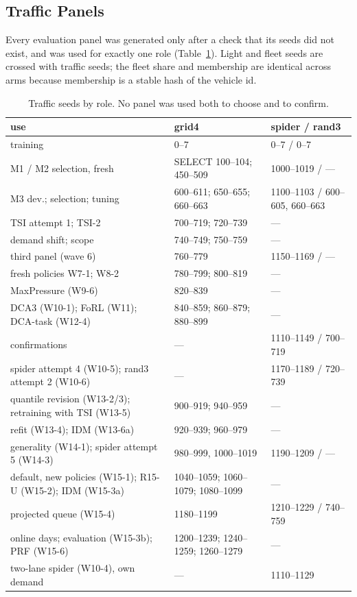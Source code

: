 \subsection{Traffic Panels}
Every evaluation panel was generated only after a check that its seeds did not exist, and was used for exactly one role
(Table~\ref{tab:panels}). Light and fleet seeds are crossed with traffic seeds; the fleet share and membership are identical across arms
because membership is a stable hash of the vehicle id.
\begin{table}[t]\centering\footnotesize\setlength{\tabcolsep}{2.5pt}
\caption{Traffic seeds by role. No panel was used both to choose and to confirm.}\label{tab:panels}\scriptsize
\begin{tabular}{@{}p{2.45cm}p{2.75cm}p{2.95cm}@{}}\toprule
use & grid4 & spider / rand3\\\midrule
training & 0--7 & 0--7 / 0--7\\
M1 / M2 selection, fresh & SELECT 100--104; 450--509 & 1000--1019 / ---\\
M3 dev.; selection; tuning & 600--611; 650--655; 660--663 & 1100--1103 / 600--605, 660--663\\
TSI attempt 1; TSI-2 & 700--719; 720--739 & ---\\
demand shift; scope & 740--749; 750--759 & ---\\
third panel (wave 6) & 760--779 & 1150--1169 / ---\\
fresh policies W7-1; W8-2 & 780--799; 800--819 & ---\\
MaxPressure (W9-6) & 820--839 & ---\\
DCA3 (W10-1); FoRL (W11); DCA-task (W12-4) & 840--859; 860--879; 880--899 & ---\\
confirmations & --- & 1110--1149 / 700--719\\
spider attempt 4 (W10-5); rand3 attempt 2 (W10-6) & --- & 1170--1189 / 720--739\\
quantile revision (W13-2/3); retraining with TSI (W13-5) & 900--919; 940--959 & ---\\
refit (W13-4); IDM (W13-6a) & 920--939; 960--979 & ---\\
generality (W14-1); spider attempt 5 (W14-3) & 980--999, 1000--1019 & 1190--1209 / ---\\
default, new policies (W15-1); R15-U (W15-2); IDM (W15-3a) & 1040--1059; 1060--1079; 1080--1099 & ---\\
projected queue (W15-4) & 1180--1199 & 1210--1229 / 740--759\\
online days; evaluation (W15-3b); PRF (W15-6) & 1200--1239; 1240--1259; 1260--1279 & ---\\
two-lane spider (W10-4), own demand & --- & 1110--1129\\\bottomrule
\end{tabular}\end{table}

